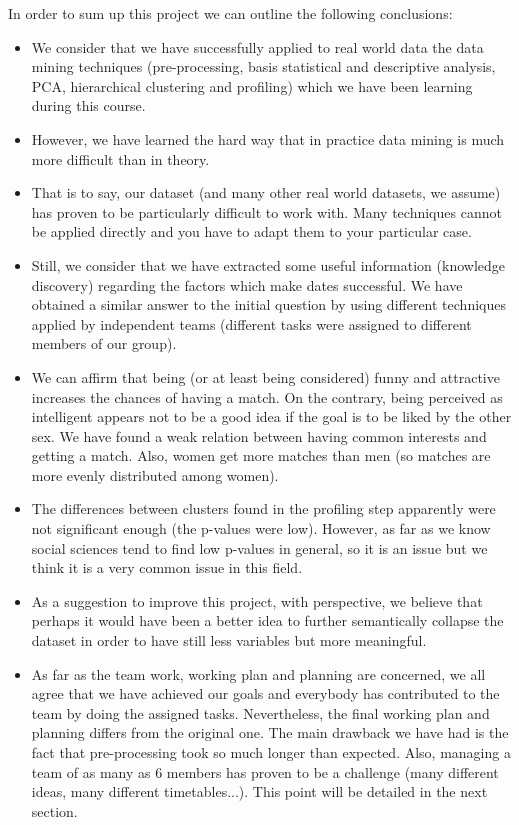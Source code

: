 
In order to sum up this project we can outline the following conclusions:
\begin{itemize}
    \item We consider that we have successfully applied to real world data the data mining techniques (pre-processing, basis statistical and descriptive analysis, PCA, hierarchical clustering and profiling) which we have been learning during this course.
    \item However, we have learned the hard way that in practice data mining is much more difficult than in theory.
    \item That is to say, our dataset (and many other real world datasets, we assume) has proven to be particularly difficult to work with. Many techniques cannot be applied directly and you have to adapt them to your particular case.
    \item Still, we consider that we have extracted some useful information (knowledge discovery) regarding the factors which make dates successful. We have obtained a similar answer to the initial question by using different techniques applied by independent teams (different tasks were assigned to different members of our group).
    \item We can affirm that being (or at least being considered) funny and attractive increases the chances of having a match. On the contrary, being perceived as intelligent appears not to be a good idea if the goal is to be liked by the other sex. We have found a weak relation between having common interests and getting a match. Also, women get more matches than men (so matches are more evenly distributed among women).
    \item The differences between clusters found in the profiling step apparently were not significant enough (the p-values were low). However, as far as we know social sciences tend to find low p-values in general, so it is an issue but we think it is a very common issue in this field.
    \item As a suggestion to improve this project, with perspective, we believe that perhaps it would have been a better idea to further semantically collapse the dataset in order to have still less variables but more meaningful.
    \item As far as the team work, working plan and planning are concerned, we all agree that we have achieved our goals and everybody has contributed to the team by doing the assigned tasks. Nevertheless, the final working plan and planning differs from the original one. The main drawback we have had is the fact that pre-processing took so much longer than expected. Also, managing a team of as many as 6 members has proven to be a challenge (many different ideas, many different timetables...). This point will be detailed in the next section.

\end{itemize}
